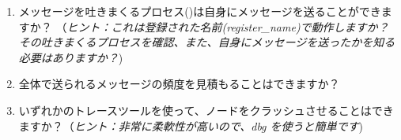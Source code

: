 \begin{enumerate}
  \item メッセージを吐きまくるプロセス()は自身にメッセージを送ることができますか？ （\emph{ヒント：これは登録された名前(register_name)で動作しますか？ その吐きまくるプロセスを確認、また、自身にメッセージを送ったかを知る必要はありますか？})

	\item 全体で送られるメッセージの頻度を見積もることはできますか？

  \item いずれかのトレースツールを使って、ノードをクラッシュさせることはできますか？（\emph{ヒント：非常に柔軟性が高いので、dbg を使うと簡単です})

\end{enumerate}


